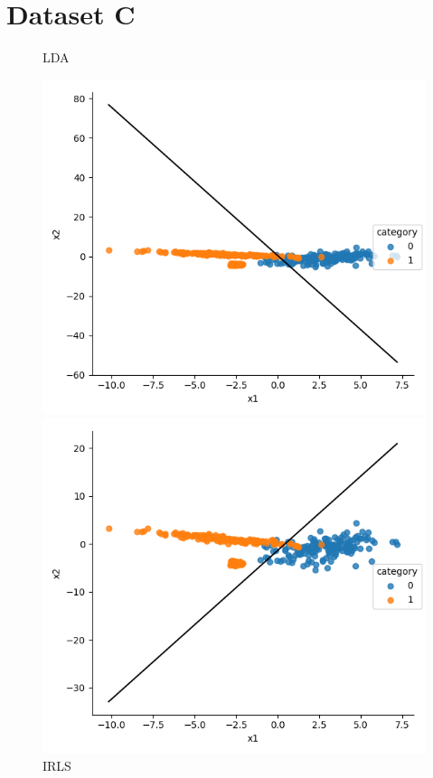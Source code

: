 \documentclass[a4paper]{article}
\begin{document}
\section{Dataset C}
\begin{figure}[h]
\centering
\begin{minipage}{0,45\textwidth}
\caption{LDA}
\includegraphics[scale=.45]{c_lda.png}
\end{minipage}
\begin{minipage}{0,45\textwidth}
\caption{IRLS}
\includegraphics[scale=.45]{c_irls.png}

\end{minipage}
\end{figure}
\end{document}
